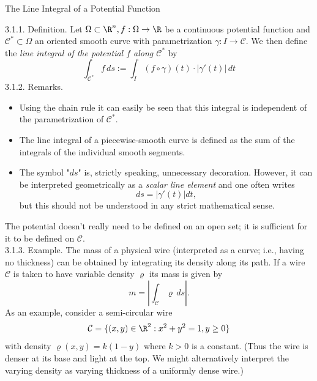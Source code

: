 \documentclass[smaller,hyperref={CJKbookmarks=true}]{beamer}
\begin{document}
\begin{frame}{The Line Integral of a Potential Function}
\begin{spacing}{1}
\begin{figure}
\end{figure}
\end{spacing}
\newpage
\begin{spacing}{0.9}
\alert{3.1.1. Definition.} Let $\Omega\subset\R^n,f:\Omega\to\R$ be a continuous potential function and $\mathcal{C}^*\subset\Omega$ an oriented smooth curve with parametrization $\gamma:I\to\mathcal{C}$. We then define the \emph{line integral of the potential $f$ along $\mathcal{C}^*$} by
\[\int_{\mathcal{C}^*}f\,ds:=\int_{I}(f\circ\gamma)(t)
\cdot|\gamma'(t)|\,dt\]
\alert{3.1.2. Remarks.}
\begin{itemize}
  \item Using the chain rule it can easily be seen that this integral is
independent of the parametrization of $\mathcal{C}^*$.
  \item The line integral of a piecewise-smooth curve is defined as the sum of
the integrals of the individual smooth segments.
  \item The symbol "$ds$" is, strictly speaking, unnecessary decoration.
However, it can be interpreted geometrically as a \emph{scalar line element}
and one often writes
\[ds=|\gamma'(t)|dt,\]
but this should not be understood in any strict mathematical sense.
\end{itemize}
\end{spacing}
\newpage
\begin{spacing}{1.05}
The potential doesn't really need to be defined on an open set; it is
suf{}ficient for it to be defined on $\mathcal{C}$.\\[5pt]
\alert{3.1.3. Example.} The mass of a physical wire (interpreted as a curve; i.e.,
having no thickness) can be obtained by integrating its density along its
path. If a wire $\mathcal{C}$ is taken to have variable density $\varrho$ its mass is given by
\[m=\left|\int_{\mathcal{C}}\varrho\,ds\right|.\]
As an example, consider a semi-circular wire
\[\mathcal{C}=\{(x,y)\in\R^2:x^2+y^2=1,y\geq0\}\]
with density $\varrho(x,y)=k(1-y)$ where $k>0$ is a constant. (Thus the wire
is denser at its base and light at the top. We might alternatively interpret
the varying density as varying thickness of a uniformly dense wire.)
\end{spacing}
\end{frame}
\end{document}
